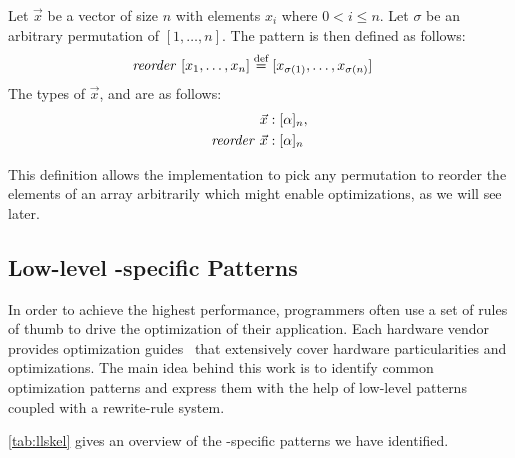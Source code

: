 \begin{definition}
  \label{definition:pattern:reorder}
  Let $\vec{x}$ be a vector of size $n$ with elements $x_i$ where $0 < i \leq n$.
  Let $\sigma$ be an arbitrary permutation of $[1,\ldots, n]$.
  The \reorder pattern is then defined as follows:
  \begin{align*}
    \text{\textit{reorder}}\ [x_1, \ldots, x_n] &\stackrel{\textrm{\scriptsize def}}{=} [x_{\sigma(1)}, \ldots, x_{\sigma(n)}]
  \end{align*}
  The types of $\vec{x}$, and \reorder are as follows:
  \begin{align*}
    \vec{x} &: [\alpha]_n,\\
    \text{\textit{reorder}}\ \vec{x} &: [\alpha]_n
  \end{align*}
\end{definition}

\noindent
This definition allows the implementation to pick any permutation to reorder the elements of an array arbitrarily which might enable optimizations, as we will see later.





\subsection{Low-level \OpenCL-specific Patterns}

In order to achieve the highest performance, programmers often use a set of rules of thumb to drive the optimization of their application.
Each hardware vendor provides optimization guides~\cite{CUDAProgrammingGuide,AMDProgrammingGuide,IntelGPUProgrammingGuide,IntelXeonProgrammingGuide} that extensively cover hardware particularities and optimizations.
The main idea behind this work is to identify common optimization patterns and express them with the help of low-level patterns coupled with a rewrite-rule system.

\autoref{tab:llskel} gives an overview of the \OpenCL-specific patterns we have identified.

